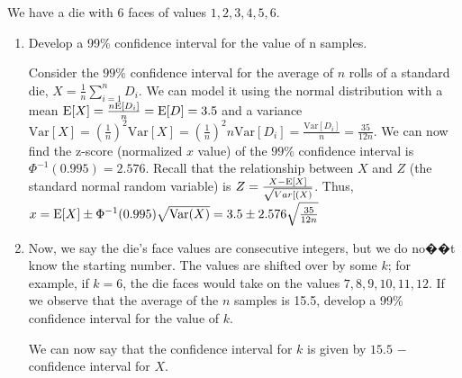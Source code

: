 \question We have a die with 6 faces of values $1, 2, 3, 4, 5, 6$.

\begin{enumerate}[label=(\alph*)]
\item Develop a 99\% confidence interval for the value of n samples. 
\begin{solution}[3cm]
Consider the $99\%$ confidence interval for the average of $n$ rolls of a standard die, $X = \frac{1}{n} \sum_{i=1}^n D_i$. 
We can model it using the normal distribution with a mean $\text{E}[X] = \frac{n\text{E}[D_i]}{n} = \text{E}[D]= 3.5$ and a variance $\text{Var}[X] = (\frac{1}{n})^2\text{Var}[X] = (\frac{1}{n})^2 n \text{Var}[D_i] = \frac{\text{Var}[D_i]}{n} = \frac{35}{12n}$.
We can now find the z-score (normalized $x$ value) of the $99\%$ confidence interval is $\Phi^{-1} (0.995) = 2.576$. 
Recall that the relationship between $X$ and $Z$ (the standard normal random variable) is $Z = \frac{X - \text{E}[X]}{\sqrt{Var[(X)}}$. Thus, $x = \text{E}[X] \pm \Phi^{-1}(0.995)\sqrt{\text{Var}(X)} = 3.5 \pm 2.576\sqrt{\frac{35}{12n}}$
\end{solution}

\item Now, we say the die's face values are consecutive integers, but we do no��t know the starting number. The values are shifted over by some $k$; for example, if $k = 6$, the die faces would take on the values 
$7, 8, 9, 10, 11, 12$. If we observe that the average of the $n$ samples is 15.5, develop a 99\% confidence 
interval for the value of $k$. 

\begin{solution}
We can now say that the confidence interval for $k$ is given by $15.5$ $-$ confidence interval for $X$.
\end{solution}
\end{enumerate}
